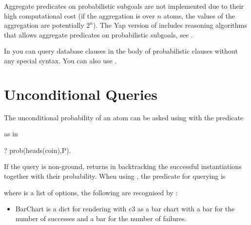 \documentclass[letterpaper,10pt,english]{sphinxmanual}
\begin{document}
Aggregate predicates on probabilistic subgoals are not implemented due to their high computational cost (if the aggregation is over \(n\) atoms, the values of the aggregation are potentially \(2^n\)).
The Yap version of  includes reasoning algorithms that allows aggregate predicates on probabilistic subgoals, see .

In  you can query database clauses in the body of probabilistic clauses without any special syntax.
You can also use .


\section{Unconditional Queries}
\label{\detokenize{index:unconditional-queries}}
The unconditional probability of an atom can be asked using  with the predicate

\begin{sphinxVerbatim}[commandchars=\\\{\}]
  
\end{sphinxVerbatim}

as in

\begin{sphinxVerbatim}[commandchars=\\\{\}]
?\PYGZhy{} prob(heads(coin),P).
\end{sphinxVerbatim}

If the query is non-ground,  returns in backtracking the successful instantiations together with their probability.
When using , the predicate for querying is

\begin{sphinxVerbatim}[commandchars=\\\{\}]
  
\end{sphinxVerbatim}

where  is a list of options, the following are recognised by :
\begin{itemize}
\item {} 
 BarChart is a dict for rendering with c3 as a bar chart with a bar for the number of successes and a bar for the number of failures.

\end{itemize}
\end{document}
